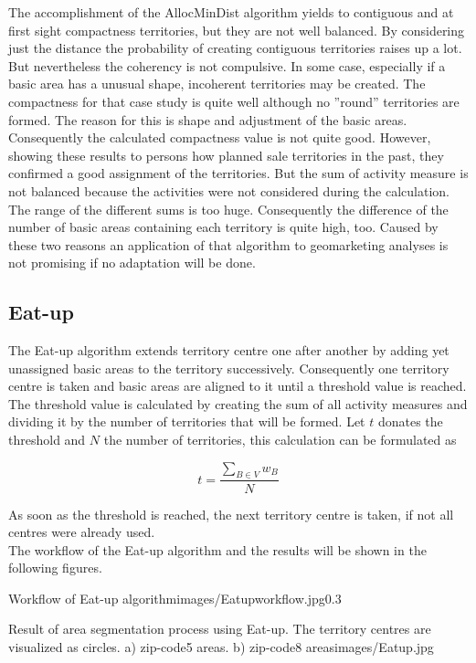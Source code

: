 The accomplishment of the AllocMinDist algorithm yields to contiguous and at first sight compactness territories, but they are not well balanced. By considering just the distance the probability of creating contiguous territories raises up a lot. But nevertheless the coherency is not compulsive. In some case, especially if a basic area has a unusual shape, incoherent territories may be created. The compactness for that case study is quite well although no ''round'' territories are formed. The reason for this is shape and adjustment of the basic areas. Consequently the calculated compactness value is not quite good. However, showing these results to persons how planned sale territories in the past, they confirmed a good assignment of the territories. But the sum of activity measure is not balanced because the activities were not considered during the calculation. The range of the different sums is too huge. Consequently the difference of the number of basic areas containing each territory is quite high, too. Caused by these two reasons an application of that algorithm to geomarketing analyses is not promising if no adaptation will be done.

\subsection{Eat-up}

The Eat-up algorithm extends territory centre one after another by adding yet unassigned basic areas to the territory successively. Consequently one territory centre is taken and basic areas are aligned to it until a threshold value is reached. The threshold value is calculated by creating the sum of all activity measures and dividing it by the number of territories that will be formed. Let $t$ donates the threshold and $N$ the number of territories, this calculation can be formulated as

\[ \mathit{t  = \frac{\sum\nolimits  _{B \in V} w_{B}}{N}}\]

As soon as the threshold is reached, the next territory centre is taken, if not all centres were already used. \\
The workflow of the Eat-up algorithm and the results will be shown in the following figures.

\begin{figurevarSize}{Workflow of Eat-up algorithm}{images/Eatupworkflow.jpg}{0.3}\end{figurevarSize}

\begin{figureOwn}{Result of area segmentation process using Eat-up. The territory centres are visualized as circles. a) zip-code5 areas. b) zip-code8 areas}{images/Eatup.jpg}\end{figureOwn}


